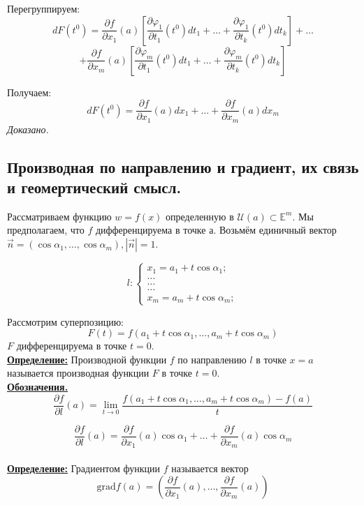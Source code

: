 \documentclass[a4paper,12pt]{article} %
\begin{document}
	Перегруппируем:
	\[dF(t^0) = \frac{\partial f}{\partial x_1}(a) \left[\frac{\partial \varphi_1}{\partial t_1}(t^0) dt_1 + \ldots + \frac{\partial \varphi_1}{\partial t_k}(t^0) dt_k \right] + \ldots\] \[+\frac{\partial f}{\partial x_m}(a) \left[ \frac{\partial \varphi_m}{\partial t_1}(t^0) dt_1 + \ldots + \frac{\partial \varphi_m}{\partial t_k}(t^0) dt_k \right]\]
	
	Получаем:
	\[dF(t^0) = \frac{\partial f}{\partial x_1}(a)dx_1 + \ldots + \frac{\partial f}{\partial x_m}(a)dx_m\]
	\textit{Доказано.}
	
	\subsection{Производная по направлению и градиент, их связь и  геомертический смысл.}
	Рассматриваем функцию $w = f(x)$ определенную в $\mathscr{U}(a) \subset \mathds{E}^m$. Мы предполагаем, что $f$ дифференцируема в точке а. Возьмём единичный вектор $\vec{n} = (\cos \alpha_1, \ldots, \cos \alpha_m), |\vec{n}| = 1$.
	
	\begin{equation*}
		l: 
		\begin{cases}
			x_1 = a_1 + t\cos \alpha_1;\\
			\ldots\\
			\ldots\\
			\ldots\\
			x_m = a_m + t\cos \alpha_m;
		\end{cases}
	\end{equation*}
	
	Рассмотрим суперпозицию:
	\[F(t) = f(a_1 + t\cos\alpha_1, \ldots, a_m + t\cos\alpha_m)\]
	$F$ дифференцируема в точке $t = 0$.\\
	
	\underline{\textbf{Определение:}} Производной функции $f$ по направлению $l$ в точке $x = a$ называется производная функции $F$ в точке $t = 0$.\\
	
	\underline{\textbf{Обозначения.}}
	\[\frac{\partial f}{\partial l}(a) = \lim\limits_{t \to 0} \frac{f(a_1 + t\cos\alpha_1, \ldots, a_m + t\cos\alpha_m) - f(a)}{t}\]
	
	\[\frac{\partial f}{\partial l}(a) = \frac{\partial f}{\partial x_1}(a)\cos\alpha_1 + \ldots + \frac{\partial f}{\partial x_m}(a)\cos\alpha_m\]\\
	
	\underline{\textbf{Определение:}} Градиентом функции $f$ называется вектор \[\mathrm{grad}{f(a)} = (\frac{\partial f}{\partial x_1}(a), \ldots, \frac{\partial f}{\partial x_m}(a))\]
	
\end{document}
